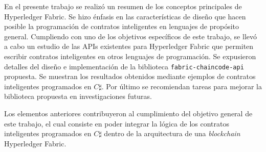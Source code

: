 \begin{conclusions}
En el presente trabajo se realizó un resumen de los conceptos principales de Hyperledger Fabric. Se hizo énfasis en las características de diseño que hacen posible la programación de contratos inteligentes en lenguajes de propósito general. Cumpliendo con uno de los objetivos específicos de este trabajo, se llevó a cabo un estudio de las APIs existentes para Hyperledger Fabric que permiten escribir contratos inteligentes en otros lenguajes de programación. Se expusieron detalles del diseño e implementación de la biblioteca \texttt{fabric-chaincode-api} propuesta. Se muestran los resultados obtenidos mediante ejemplos de contratos inteligentes programados en $ C \sharp $. Por último se recomiendan tareas para mejorar la biblioteca propuesta en investigaciones futuras.

Los elementos anteriores contribuyeron al cumplimiento del objetivo general de este trabajo, el cual consiste en poder integrar la lógica de los contratos inteligentes programados en $ C \sharp $ dentro de la arquitectura de una \textit{blockchain} Hyperledger Fabric.
\end{conclusions}

